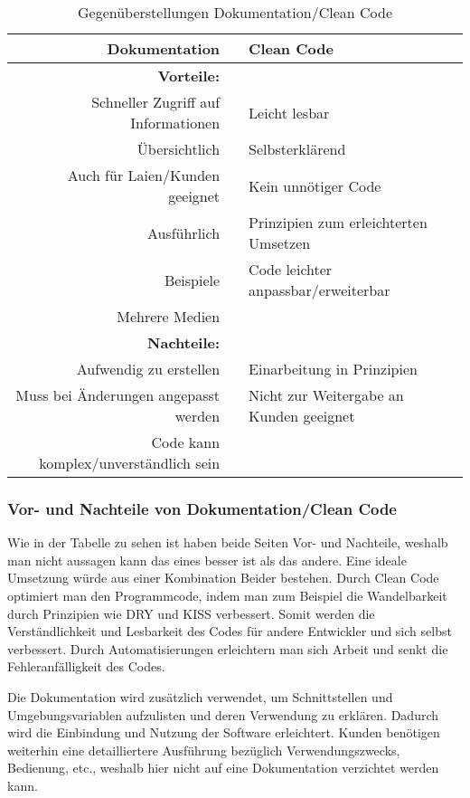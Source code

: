 \begin{table}[hbt]
\centering
\begin{minipage}[t]{1\textwidth} %
\caption{Gegenüberstellungen Dokumentation/Clean Code} %
\begin{tabularx}{\columnwidth}{rXl}
\toprule
Dokumentation && Clean Code\\
\midrule
\textbf{Vorteile:} \\
Schneller Zugriff auf Informationen && Leicht lesbar\\
Übersichtlich && Selbsterklärend\\
Auch für Laien/Kunden geeignet && Kein unnötiger Code\\
Ausführlich && Prinzipien zum erleichterten Umsetzen\\
Beispiele && Code leichter anpassbar/erweiterbar\\
Mehrere Medien && \\
\midrule
\textbf{Nachteile:} \\
Aufwendig zu erstellen && Einarbeitung in Prinzipien\\
Muss bei Änderungen angepasst werden && Nicht zur Weitergabe an Kunden geeignet\\
Code kann komplex/unverständlich sein && \\
\bottomrule
\end{tabularx}
\end{minipage}
\end{table}

\subsubsection*{Vor- und Nachteile von Dokumentation/Clean Code}

Wie in der Tabelle zu sehen ist haben beide Seiten Vor- und Nachteile, weshalb man nicht aussagen kann das eines besser ist als das andere. Eine ideale Umsetzung würde aus einer Kombination Beider bestehen. Durch Clean Code optimiert man den Programmcode, indem man zum Beispiel die Wandelbarkeit durch Prinzipien wie DRY und KISS verbessert. Somit werden die Verständlichkeit und Lesbarkeit des Codes für andere Entwickler und sich selbst verbessert. Durch Automatisierungen erleichtern man sich Arbeit und senkt die Fehleranfälligkeit des Codes. 

Die Dokumentation wird zusätzlich verwendet, um Schnittstellen und Umgebungsvariablen aufzulisten und deren Verwendung zu erklären. Dadurch wird die Einbindung und Nutzung der Software erleichtert. Kunden benötigen weiterhin eine detailliertere Ausführung bezüglich Verwendungszwecks, Bedienung, etc., weshalb hier nicht auf eine Dokumentation verzichtet werden kann.

